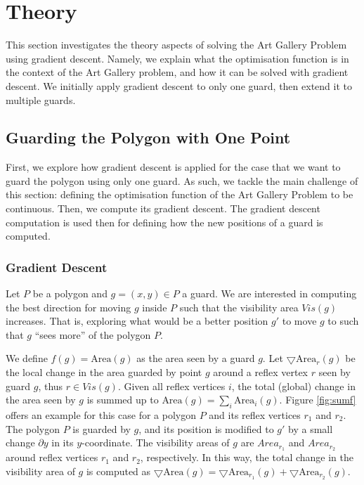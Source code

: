 \section{Theory}
\label{sec:theory}

This section investigates the theory aspects of solving the Art Gallery Problem using gradient descent. Namely, we explain what the optimisation function is in the context of the Art Gallery problem, and how it can be solved with gradient descent. We initially apply gradient descent to only one guard, then extend it to multiple guards.

\subsection{Guarding the Polygon with One Point}

First, we explore how gradient descent is applied for the case that we want to guard the polygon using only one guard. As such, we tackle the main challenge of this section: defining the optimisation function of the Art Gallery Problem to be continuous. Then, we compute its gradient descent. The gradient descent computation is used then for defining how the new positions of a guard is computed.

\subsubsection{Gradient Descent}
\label{sec:gradient}

Let $P$ be a polygon and $g = (x, y) \in P$ a guard. We are interested in computing the best direction for moving $g$ inside $P$ such that the visibility area $\mathit{Vis}(g)$ increases. That is, exploring what would be a better position $g'$ to move $g$ to such that $g$ ``sees more'' of the polygon $P$. 

We define $f(g) = \text{Area}(g)$ as the area seen by a guard $g$. Let $\bigtriangledown \text{Area}_r(g)$ be the local change in the area guarded by point $g$ around a reflex vertex $r$ seen by guard $g$, thus $r \in \mathit{Vis(g)}$. Given all reflex vertices $i$, the total (global) change in the area seen by $g$ is summed up to $\text{Area}(g) = \sum_i \text{Area}_i(g)$. Figure \ref{fig:sumf} offers an example for this case for a polygon $P$ and its reflex vertices $r_1$ and $r_2$. The polygon $P$ is guarded by $g$, and its position is modified to $g'$ by a small change $\partial y$ in its $y$-coordinate. The visibility areas of $g$ are $Area_{r_1}$ and $Area_{r_2}$ around reflex vertices $r_1$ and $r_2$, respectively. In this way, the total change in the visibility area of $g$ is computed as $\bigtriangledown \text{Area}(g) = \bigtriangledown \text{Area}_{r_1}(g) + \bigtriangledown \text{Area}_{r_2}(g)$.

